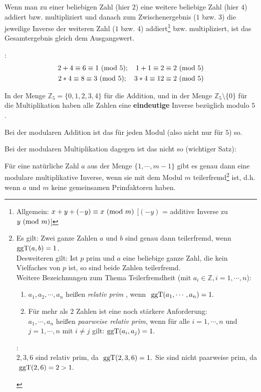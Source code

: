\begin{refsegment}
Wenn man zu einer beliebigen Zahl (hier $2$) eine weitere beliebige Zahl (hier $4$) addiert bzw.
multipliziert und danach zum Zwischenergebnis ($1$ bzw. $3$)
die jeweilige Inverse der weiteren Zahl ($1$ bzw. $4$)
addiert\footnote{%
Allgemein: $x + y + (-y) \equiv x{\rm ~(mod~}m)$ [$(-y)$ = additive Inverse zu $y{\rm ~(mod~}m)$]
} bzw. multipliziert,
ist das Gesamtergebnis gleich dem Ausgangswert.

\begin{example}{:}
\begin{eqnarray*}
2 + 4 \equiv 6 \equiv 1 {\rm ~(mod~ } 5) ; \quad 1 + 1 \equiv 2 \equiv 2 {\rm ~(mod~ } 5)  \nonumber\\
2 * 4 \equiv 8 \equiv 3 {\rm ~(mod~ } 5) ; \quad 3 * 4 \equiv 12 \equiv 2 {\rm ~(mod~ } 5) \nonumber
\end{eqnarray*}
\end{example}


In der Menge $\mathbb{Z}_5 = \{0, 1, 2, 3, 4\}$ für die Addition, und in der
Menge $\mathbb{Z}_5 \setminus \{ 0\}$  für die Multiplikation haben alle Zahlen
eine \textbf{eindeutige} Inverse bezüglich modulo $5$.

Bei der modularen Addition ist das für jeden Modul (also nicht nur für $5$)
so.

Bei der modularen Multiplikation dagegen ist das nicht so (wichtiger Satz):
\begin{satz}\label{thm-zth-multinv}
Für eine natürliche Zahl $a$ aus der Menge $\{1, \cdots, m-1\}$ gibt es genau
dann eine modulare multiplikative Inverse, wenn sie mit dem Modul
$m$ teilerfremd\footnote{%
  Es gilt: Zwei ganze Zahlen $a$ und $b$ sind genau dann teilerfremd, wenn ${\rm ggT}(a, b) = 1$.\\
  Desweiteren gilt: Ist $p$ prim und $a$ eine beliebige ganze Zahl, die kein
  Vielfaches von $p$ ist, so sind beide Zahlen teilerfremd.\\
  Weitere Bezeichnungen zum Thema Teilerfremdheit (mit $a_i \in \mathbb{Z},
  i=1, \cdots, n$):
  \begin{enumerate}
  \item $a_1,a_2, \cdots, a_n$ heißen {\em relativ prim}
    ,
    wenn $ {\rm~ggT}(a_1, \cdots , a_n) =1.$
  \item Für mehr als $2$ Zahlen  ist eine noch stärkere Anforderung:\\
    $a_1, \cdots , a_n$ heißen {\em paarweise relativ prim}, wenn für alle
    $i=1, \cdots, n$ und $j=1, \cdots , n$ mit $ i \neq j $ gilt:
    $ {\rm ggT} (a_i, a_j) =1. $
  \end{enumerate}
  \begin{example}{:}\\
  $2,3,6 $ sind relativ prim, da $ {\rm~ggT} (2,3,6)=1.$
  Sie sind nicht paarweise prim, da $ {\rm~ggT} (2,6)=2>1.$
  \end{example}
} ist, d.h. wenn $a$ und $m$ keine gemeinsamen Primfaktoren haben.
\end{satz}


\end{refsegment}
